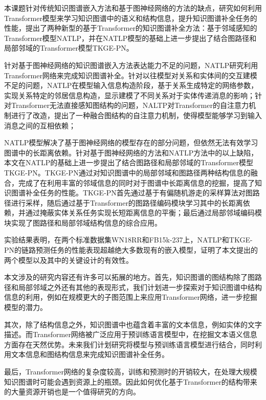 \summary
本课题针对传统知识图谱嵌入方法和基于图神经网络的方法的缺点，研究如何利用Transformer模型来学习知识图谱中的语义和结构信息，提升知识图谱补全任务的性能，提出了两种新型的基于Transformer的知识图谱补全方法：基于邻域感知的Transformer模型NATLP，并在NATLP模型的基础上进一步提出了结合图路径和局部邻域的Transformer模型TKGE-PN。

针对基于图神经网络的知识图谱嵌入方法表达能力不足的问题，NATLP研究利用Transformer网络来完成知识图谱补全。针对以往模型对关系和实体间的交互建模不足的问题，NATLP在模型输入信息构造阶段，基于关系生成特定的网络参数，实现关系特定的邻居信息构造，显示建模了不同关系对于实体传递消息的影响；针对Transformer无法直接感知图结构的问题，NALTP对Transformer的自注意力机制进行了改造，提出了一种融合图结构的自注意力机制，使得模型能够学习到输入消息之间的互相依赖；

NATLP模型解决了基于图神经网络的模型存在的部分问题，但依然无法有效学习图谱中的长距离依赖。针对基于图神经网络的方法和NATLP方法中的以上缺陷，本文在NATLP的基础上进一步提出了结合图路径和局部邻域的Transformer模型TKGE-PN。TKGE-PN通过对知识图谱中的局部邻域和图路径两种结构信息的融合，完成了在利用丰富的邻域信息的同时对于图谱中长距离信息的挖掘，提高了知识图谱补全任务的性能。TKGE-PN首先通过基于有偏随机游走的采样算法对图路径进行采样，随后通过基于Transformer的图路径编码模块学习其中的长距离依赖，并通过掩蔽实体关系任务实现长短距离信息的平衡；最后通过局部邻域编码模块实现了图路径和局部邻域结构信息的综合应用。

实验结果表明，在两个标准数据集WN18RR和FB15k-237上，NATLP和TKGE-PN的链路预测任务的性能表现超越绝大多数现有的嵌入模型，证明了本文提出的两个模型以及其中的关键设计的有效性。


本文涉及的研究内容还有许多可以拓展的地方。首先，知识图谱的图结构除了图路径和局部邻域之外还有其他的表现形式，我们计划进一步探索对于知识图谱中结构信息的利用，例如在规模更大的子图范围上来应用Transformer网络，进一步挖掘模型的潜力。

其次，除了结构信息之外，知识图谱中也蕴含着丰富的文本信息，例如实体的文字描述。而Transformer网络被广泛应用于预训练语言模型中，在挖掘文本语义信息方面存在天然优势。未来我们计划研究将模型与预训练语言模型进行结合，同时利用文本信息和图结构信息来完成知识图谱补全任务。

最后，Transformer网络的复杂度较高，训练和预测时的开销较大，在处理大规模知识图谱时可能会遇到资源上的瓶颈。因此如何优化基于Transformer的结构带来的大量资源开销也是一个值得研究的方向。

